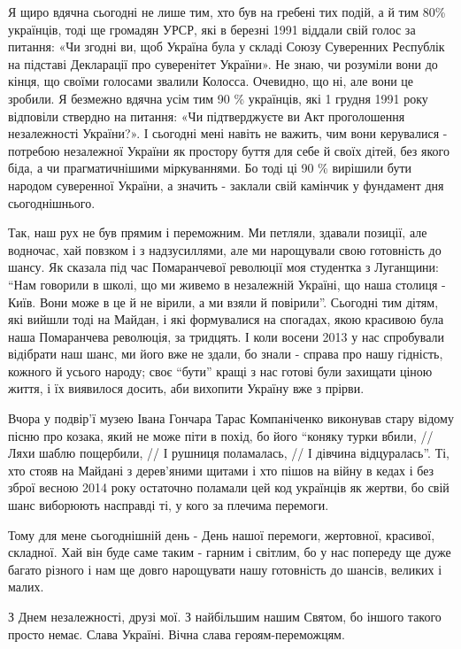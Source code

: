 Я щиро вдячна сьогодні не лише тим, хто був на гребені тих подій, а й тим 80\%
українців, тоді ще громадян УРСР, які в березні 1991 віддали свій голос за
питання: «Чи згодні ви, щоб Україна була у складі Союзу Суверенних Республік на
підставі Декларації про суверенітет України». Не знаю, чи розуміли вони до
кінця, що своїми голосами звалили Колосса. Очевидно, що ні, але вони це
зробили. Я безмежно вдячна усім тим 90 \% українців, які 1 грудня 1991 року
відповіли ствердно на питання: «Чи підтверджуєте ви Акт проголошення
незалежності України?». І сьогодні мені навіть не важить, чим вони керувалися -
потребою незалежної України як простору буття для себе й своїх дітей, без якого
біда, а чи прагматичнішими міркуваннями. Бо тоді ці 90 \% вирішили бути народом
суверенної України, а значить - заклали свій камінчик у фундамент дня
сьогоднішнього.

Так, наш рух не був прямим і переможним. Ми петляли, здавали позиції, але
водночас, хай повзком і з надзусиллями, але ми нарощували свою готовність до
шансу. Як сказала під час Помаранчевої революції моя студентка з Луганщини:
\enquote{Нам говорили в школі, що ми живемо в незалежній Україні, що наша столиця -
Київ. Вони може в це й не вірили, а ми взяли й повірили}. Сьогодні тим дітям,
які вийшли тоді на Майдан, і які формувалися на спогадах, якою красивою була
наша Помаранчева революція, за тридцять. І коли восени 2013 у нас спробували
відібрати наш шанс, ми його вже не здали, бо знали - справа про нашу гідність,
кожного й усього народу; своє \enquote{бути} кращі з нас готові були захищати ціною
життя, і їх виявилося досить, аби вихопити Україну вже з прірви.

Вчора у подвір’ї музею Івана Гончара Тарас Компаніченко виконував стару відому
пісню про козака, який не може піти в похід, бо його “коняку турки вбили, //
Ляхи шаблю пощербили, // І рушниця поламалась, // І дівчина відцуралась”. Ті,
хто стояв на Майдані з дерев'яними щитами і хто пішов на війну в кедах і без
зброї весною 2014 року остаточно поламали цей код українців як жертви, бо свій
шанс виборюють насправді ті, у кого за плечима перемоги.

Тому для мене сьогоднішній день - День нашої перемоги, жертовної, красивої,
складної. Хай він буде саме таким - гарним і світлим, бо у нас попереду ще дуже
багато різного і нам ще довго нарощувати нашу готовність до шансів, великих і
малих.  

З Днем незалежності, друзі мої. З найбільшим нашим Святом, бо іншого такого
просто немає. Слава Україні. Вічна слава героям-переможцям.
